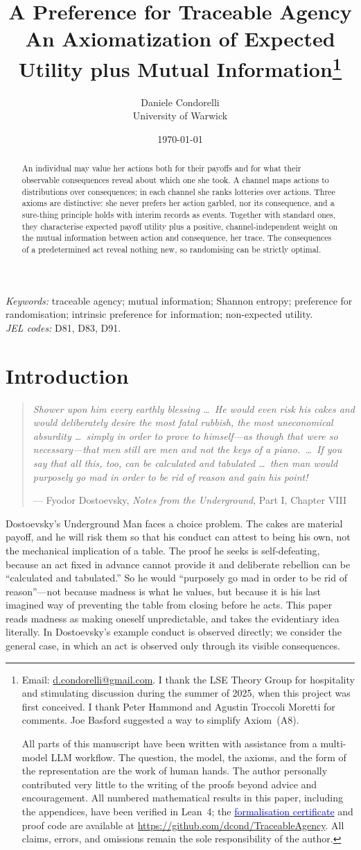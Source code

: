 \documentclass[11pt,a4paper]{article}
\title{A Preference for Traceable Agency\\[0.35em]
\large An Axiomatization of Expected Utility plus Mutual Information\thanks{Email:
\href{mailto:d.condorelli@gmail.com}{d.condorelli@gmail.com}.  I thank the LSE Theory Group for hospitality and stimulating discussion during the summer of 2025, when this project was first conceived. I thank Peter Hammond and Agustin Troccoli Moretti for comments. Joe Basford suggested a way to simplify Axiom~(A8).

\smallskip
All parts of this manuscript have been written with assistance from a multi-model LLM workflow.  The
question, the model, the axioms, and the form of the representation are the work of human hands.  The author
personally contributed very little to the writing of the proofs beyond advice and encouragement.
All numbered mathematical results in this paper, including the appendices, have been verified in
Lean~4; the \href{https://github.com/dcond/TraceableAgency/blob/main/Certificate/FORMALIZATION_CERTIFICATE.md}{\textcolor{blue}{formalisation certificate}}
and proof code are available at \url{https://github.com/dcond/TraceableAgency}.
All claims, errors, and omissions remain the sole responsibility of the author.}}
\author{Daniele Condorelli\\University of Warwick}
\date{\today}
\theoremstyle{definition}
\newcommand{\1}{\mathbf 1}
\begin{document}
\maketitle

\begin{abstract}
\noindent
An individual may value her actions both for their payoffs and for what their observable consequences reveal
about which one she took.  A channel maps actions to distributions over consequences; in each channel she ranks
lotteries over actions.  Three axioms are distinctive: she never prefers her action garbled, nor its consequence, and
a sure-thing principle holds with interim records as events.  Together with standard ones, they characterise
expected payoff utility plus a positive, channel-independent weight on the mutual information between action and
consequence, her trace.  The consequences of a predetermined act reveal nothing new, so randomising can be
strictly optimal.
\end{abstract}

\medskip
\noindent\textit{Keywords:} traceable agency; mutual information; Shannon entropy; preference for
randomisation; intrinsic preference for information; non-expected utility.\\
\textit{JEL codes:} D81, D83, D91.

\clearpage

\section{Introduction}


\begin{quote}
\emph{Shower upon him every earthly blessing \ldots\ He would even risk his cakes and would deliberately desire the
most fatal rubbish, the most uneconomical absurdity \ldots\ simply in order to prove to himself---as though that were
so necessary---that men still are men and not the keys of a piano.\ \ldots\ If you say that all this, too, can be
calculated and tabulated \ldots\ then man would purposely go mad in order to be rid of reason and gain his point!}

\hfill --- Fyodor Dostoevsky, \emph{Notes from the Underground}, Part I, Chapter VIII \cite{Dostoevsky1864}
\end{quote}


Dostoevsky's Underground Man faces a choice problem.  The cakes are material payoff, and he will risk them so
that his conduct can attest to being his own, not the mechanical implication of a table.  The proof he seeks
is self-defeating, because an act fixed in advance cannot provide it and deliberate rebellion can be
“calculated and tabulated.”  So he would “purposely go mad in order to be rid of reason”---not because
madness is what he values, but because it is his last imagined way of preventing the table from closing before he
acts.  This paper reads madness as making oneself unpredictable, and takes the evidentiary idea literally.  In
Dostoevsky's example conduct is observed directly; we consider the general case, in which an act is observed
only through its visible consequences.
\end{document}
